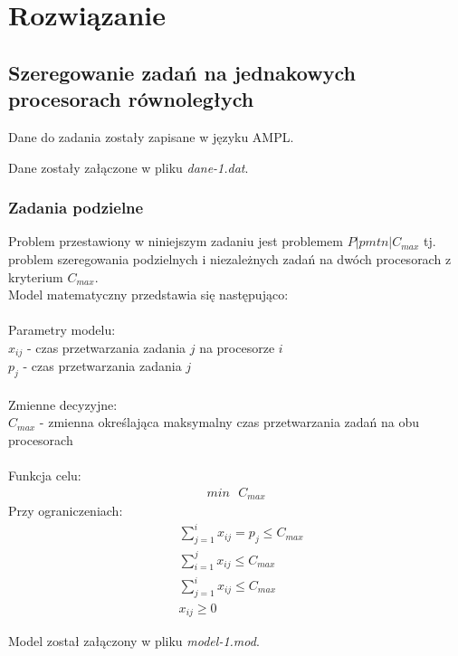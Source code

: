 \documentclass[
    12pt, %
]{../fphw}
\begin{document}
\newpage
\section{Rozwiązanie}
\subsection{Szeregowanie zadań na jednakowych procesorach równoległych}
Dane do zadania zostały zapisane w języku AMPL.

Dane zostały załączone w pliku \textit{dane-1.dat}.
\subsubsection{Zadania podzielne}
Problem przestawiony w niniejszym zadaniu jest problemem \(P|pmtn|C_{max}\)
tj. problem szeregowania podzielnych i niezależnych zadań na dwóch procesorach z kryterium \(C_{max}\). \\
Model matematyczny przedstawia się następująco: \\ \\
Parametry modelu: \\
\(x_{ij}\) - czas przetwarzania zadania \(j\) na procesorze \(i\) \\
\(p_j\) - czas przetwarzania zadania \(j\) \\ \\
Zmienne decyzyjne: \\
\(C_{max}\) - zmienna określająca maksymalny czas przetwarzania zadań na obu procesorach \\ \\
Funkcja celu: \\
\begin{align*}
    min \text{ } C_{max}
\end{align*}
Przy ograniczeniach: \\
\begin{align*}
     & \sum^i_{j=1}x_{ij} = p_j \leq C_{max} \\
     & \sum^j_{i=1}x_{ij} \leq C_{max}       \\
     & \sum^i_{j=1}x_{ij} \leq C_{max}       \\
     & x_{ij} \geq 0
\end{align*}

\newpage


Model został załączony w pliku \textit{model-1.mod}.
\end{document}
